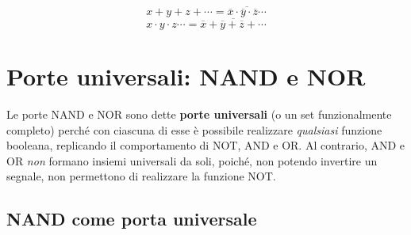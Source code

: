 \documentclass[11pt,a4paper]{report}
\begin{document}
\[
x+y+z+\cdots = \overline{\overline{x}\cdot\overline{y}\cdot\overline{z}\cdots}
\]
\[
x\cdot y\cdot z\cdots = \overline{\overline{x}+\overline{y}+\overline{z}+\cdots}
\]

\section{Porte universali: NAND e NOR}

Le porte NAND e NOR sono dette \textbf{porte universali} (o un set funzionalmente completo) perché con ciascuna di esse è possibile realizzare \emph{qualsiasi} funzione booleana, replicando il comportamento di NOT, AND e OR. 
Al contrario, AND e OR \emph{non} formano insiemi universali da soli, poiché, non potendo invertire un segnale, non permettono di realizzare la funzione NOT.

\subsection{NAND come porta universale}
\end{document}
